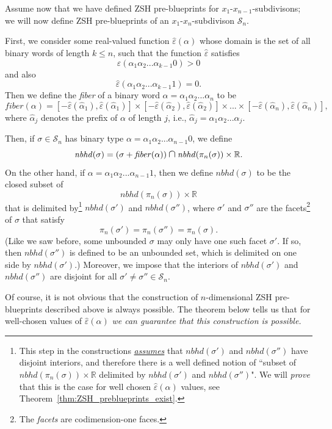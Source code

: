 \documentclass[12pt,letterpaper]{article}
\renewcommand{\S}{\mathcal{S}}
\newcommand{\RR}{\mathbb{R}}
\newcommand{\eps}{\varepsilon}
\newcommand*{\medcap}{\mathbin{\scalebox{1.25}{\ensuremath{\cap}}}}%
\newcommand{\fiber}{\mathit{fiber}}
\newcommand{\nbhd}{\mathit{nbhd}}
\renewcommand{\a}{\alpha}
\begin{document}
\bigskip

Assume now that we have defined ZSH pre-blueprints for $x_1$-$x_{n-1}$-subdivisons; we will now  define ZSH pre-blueprints of an $x_1$-$x_n$-subdivison $\S_n$. 

\noindent
First, we consider some real-valued function $\hat\eps(\a)$ whose domain is the set of all binary words of length $k \le n$, such that the  function $\hat\eps$ satisfies 
$$
\hat\eps(\a_1\a_2 ... \a_{k-1}0) > 0
$$
and also 
$$
\hat\eps(\a_1\a_2 ... \a_{k-1}1) = 0.
$$
Then we define the {\em fiber} of a binary word $\a = \a_1\a_2 ... \a_n$ to be 
$$
\fiber(\a) = [-\hat\eps(\hat\a_1), \hat\eps(\hat\a_1)] \times [-\hat\eps(\hat\a_2), \hat\eps(\hat\a_2)] \times ... \times [-\hat\eps(\hat\a_n), \hat\eps(\hat\a_n)], 
$$
where $\hat\a_j$ denotes the prefix of $\a$ of length $j$, i.e., $\hat\a_j = \a_1\a_2...\a_j$.

\noindent
Then, if $\sigma \in \S_n$ has binary type $\a = \a_1\a_2 ... \a_{n-1}0$, we define 
$$
\nbhd(\sigma) = \left( \sigma +  \fiber(\a) \right) \medcap \nbhd(\pi_n(\sigma)) \times \RR.
$$
On the other hand, if $\a = \a_1\a_2 ... \a_{n-1}1$, then we define $\nbhd(\sigma)$ to be the closed subset of 
$$
\nbhd(\pi_n(\sigma)) \times \RR
$$
that is delimited by\footnote{This step in the constructions \ul{\em assumes} that $\nbhd(\sigma')$ and $\nbhd(\sigma'')$ have disjoint interiors, and  therefore there  is a well defined notion of ``subset of $\nbhd(\pi_n(\sigma)) \times \RR$ delimited by $\nbhd(\sigma')$ and $\nbhd(\sigma'')$". We will {\em prove} that this is the case for well chosen $\hat\eps(\a)$ values, see Theorem~\ref{thm:ZSH_preblueprints_exist}.} $\nbhd(\sigma')$ and $\nbhd(\sigma'')$, where $\sigma'$ and $\sigma''$ are the facets\footnote{
The {\em facets} are codimension-one faces.
} of  $\sigma$ that satisfy 
$$
\pi_n(\sigma') = \pi_n(\sigma'') = \pi_n(\sigma).
$$
(Like we saw before, some unbounded $\sigma$ may only have one such facet $\sigma'$. If so, then $\nbhd(\sigma'')$ is defined to be an unbounded set, which is delimited on one side by $\nbhd(\sigma')$.) 
Moreover, we impose that the interiors of $\nbhd(\sigma')$ and $\nbhd(\sigma'')$ are disjoint for all $\sigma' \neq \sigma'' \in \S_n$.

\bigskip

Of course, it is not obvious that the construction of $n$-dimensional ZSH pre-blueprints described above is always possible. The theorem below tells us that for well-chosen values of $\hat\eps(\a)$ {\em we can guarantee that this construction is possible.}
\end{document}
